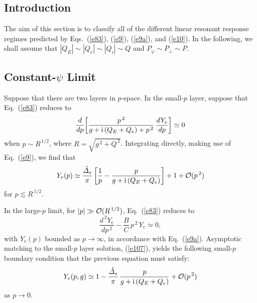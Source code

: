 \documentclass[titlepage=false,12pt]{article}
\begin{document}
\subsection{Introduction}
The aim of this section is to classify all of the different linear resonant response regimes predicted by Eqs.~(\ref{e83}), (\ref{e9}), (\ref{e9a}), and (\ref{e10}). In the following, we shall
assume that $|Q_E|\sim |Q_e|\sim |Q_i| \sim Q$ and $P_\varphi\sim P_\perp\sim P$. 

\subsection{Constant-$\psi$ Limit}\label{scpl}
Suppose that there are two layers in $p$-space. In the small-$p$ layer, suppose that Eq.~(\ref{e83}) reduces to
\begin{equation}
\frac{d}{d p}\!\left[\frac{p^{\,2}}{g+{\rm i}\,(Q_E+Q_e)+p^{\,2}}\,\frac{d Y_e}{d p}\right]\simeq 0
\end{equation}
when $p \sim R^{\,1/2}$, where $R= \sqrt{g^{\,2}+ Q^{\,2}}$. 
 Integrating directly, making use of Eq.~(\ref{e9}), we find that
\begin{equation}\label{e107}
Y_e(p)\simeq \frac{\hat{\mit\Delta}_s}{\pi}\left[\frac{1}{p} - \frac{p}{g+{\rm i}\,(Q_E+Q_e)}\right] + 1 + {\cal O}(p^{\,2})
\end{equation}
for $p \lesssim R^{\,1/2}$.

In the large-$p$ limit, for $|p|\gg {\cal O}(R^{\,1/2})$,  Eq.~(\ref{e83}) reduces to 
\begin{equation}\label{e329}
\frac{d^{\,2}Y_e}{d p^{\,2}}- \frac{B}{C}\,p^{\,2}\,Y_e\simeq 0,
\end{equation}
with $Y_e(p)$ bounded as $p\rightarrow\infty$, in accordance with Eq.~(\ref{e9a}). Asymptotic matching to the small-$p$
layer solution, (\ref{e107}), yields the following small-$p$ boundary condition  that the previous equation must satisfy:
\begin{equation}\label{e330}
Y_e(p,g)\simeq 1-\frac{\hat{\mit\Delta}_s}{\pi}\,\frac{p}{g+{\rm i}\,(Q_E+Q_e)} + {\cal O}(p^{\,2})
\end{equation}
as $p\rightarrow 0$. 
\end{document}
